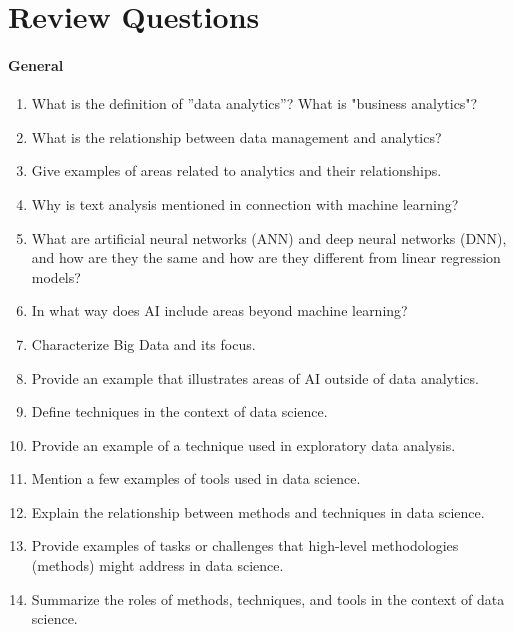 \section{Review Questions}

\paragraph*{General}
\begin{enumerate}[nosep]
	\item What is the definition of ''data analytics''? What is "business analytics"?
	\item What is the relationship between data management and analytics?
	\item Give examples of areas related to analytics and their relationships.
	\item Why is text analysis mentioned in connection with machine learning?
	\item What are artificial neural networks (ANN) and deep neural networks (DNN), and how are they the same and how are they different from linear regression models?
	\item In what way does AI include areas beyond machine learning?
	\item Characterize Big Data and its focus.
	\item Provide an example that illustrates areas of AI outside of data analytics.
	\item Define techniques in the context of data science.
    \item Provide an example of a technique used in exploratory data analysis.
	\item Mention a few examples of tools used in data science.
	\item Explain the relationship between methods and techniques in data science.
	\item Provide examples of tasks or challenges that high-level methodologies (methods) might address in data science.
	\item Summarize the roles of methods, techniques, and tools in the context of data science.
\end{enumerate}
